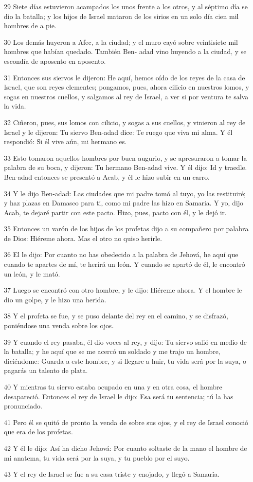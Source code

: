 \par 29 Siete días estuvieron acampados los unos frente a los otros, y al séptimo día se dio la batalla; y los hijos de Israel mataron de los sirios en un solo día cien mil hombres de a pie.
\par 30 Los demás huyeron a Afec, a la ciudad; y el muro cayó sobre veintisiete mil hombres que habían quedado. También Ben- adad vino huyendo a la ciudad, y se escondía de aposento en aposento.
\par 31 Entonces sus siervos le dijeron: He aquí, hemos oído de los reyes de la casa de Israel, que son reyes clementes; pongamos, pues, ahora cilicio en nuestros lomos, y sogas en nuestros cuellos, y salgamos al rey de Israel, a ver si por ventura te salva la vida.
\par 32 Ciñeron, pues, sus lomos con cilicio, y sogas a sus cuellos, y vinieron al rey de Israel y le dijeron: Tu siervo Ben-adad dice: Te ruego que viva mi alma. Y él respondió: Si él vive aún, mi hermano es.
\par 33 Esto tomaron aquellos hombres por buen augurio, y se apresuraron a tomar la palabra de su boca, y dijeron: Tu hermano Ben-adad vive. Y él dijo: Id y traedle. Ben-adad entonces se presentó a Acab, y él le hizo subir en un carro.
\par 34 Y le dijo Ben-adad: Las ciudades que mi padre tomó al tuyo, yo las restituiré; y haz plazas en Damasco para ti, como mi padre las hizo en Samaria. Y yo, dijo Acab, te dejaré partir con este pacto. Hizo, pues, pacto con él, y le dejó ir.
\par 35 Entonces un varón de los hijos de los profetas dijo a su compañero por palabra de Dios: Hiéreme ahora. Mas el otro no quiso herirle.
\par 36 El le dijo: Por cuanto no has obedecido a la palabra de Jehová, he aquí que cuando te apartes de mí, te herirá un león. Y cuando se apartó de él, le encontró un león, y le mató.
\par 37 Luego se encontró con otro hombre, y le dijo: Hiéreme ahora. Y el hombre le dio un golpe, y le hizo una herida.
\par 38 Y el profeta se fue, y se puso delante del rey en el camino, y se disfrazó, poniéndose una venda sobre los ojos.
\par 39 Y cuando el rey pasaba, él dio voces al rey, y dijo: Tu siervo salió en medio de la batalla; y he aquí que se me acercó un soldado y me trajo un hombre, diciéndome: Guarda a este hombre, y si llegare a huir, tu vida será por la suya, o pagarás un talento de plata.
\par 40 Y mientras tu siervo estaba ocupado en una y en otra cosa, el hombre desapareció. Entonces el rey de Israel le dijo: Esa será tu sentencia; tú la has pronunciado.
\par 41 Pero él se quitó de pronto la venda de sobre sus ojos, y el rey de Israel conoció que era de los profetas.
\par 42 Y él le dijo: Así ha dicho Jehová: Por cuanto soltaste de la mano el hombre de mi anatema, tu vida será por la suya, y tu pueblo por el suyo.
\par 43 Y el rey de Israel se fue a su casa triste y enojado, y llegó a Samaria.

